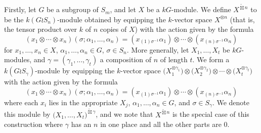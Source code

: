 Firstly, let $G$ be a subgroup of $S_m$, and
let $X$ be a $kG$-module. We define $X^{\widetilde\boxtimes n}$ to be the $k(G{\wr}S_n)$-module obtained by
equipping the $k$-vector space $X^{\otimes n}$ (that is, the tensor product over $k$ of $n$ copies of $X$) with the action given by the
formula
\[
	(x_1\otimes\cdots\otimes x_n)(\sigma;\alpha_1,\ldots,\alpha_n) = (x_{(1)\sigma^{-1}}\alpha_1)\otimes\cdots
	\otimes(x_{(n)\sigma^{-1}}\alpha_n)
\]
for $x_1,\ldots,x_n \in X$, $\alpha_1,\ldots,\alpha_n \in G$, $\sigma \in S_n$.
More generally, let $X_1,\ldots,X_t$ be $kG$-modules, and $\gamma = (\gamma_1,\ldots,\gamma_t)$ a composition of $n$ of length $t$.
We form a $k(G{\wr}S_{\gamma})$-module by equipping the $k$-vector space
$\bigl(X^{\otimes \gamma_1}_1\bigr)\otimes\bigl(X^{\otimes \gamma_2}_2\bigr)\otimes\cdots\otimes\bigl(X^{\otimes \gamma_t}_t\bigr)$
with the action given by the formula
\[
	(x_1\otimes\cdots\otimes x_n)(\sigma;\alpha_1,\ldots,\alpha_n) = (x_{(1)\sigma^{-1}}\alpha_1)\otimes\cdots
	\otimes(x_{(n)\sigma^{-1}}\alpha_n)
\]
where each $x_i$ lies in the appropriate $X_j$, $\alpha_1,\ldots,\alpha_n \in G$, and $\sigma \in S_{\gamma}$. We denote this module by
$\bigl(X_1,\ldots,X_t\bigr)^{\widetilde\boxtimes \gamma}$, and we note that $X^{\widetilde\boxtimes n}$ is the
special case of this construction where $\gamma$ has an $n$ in one place and all the other parts are 0.

